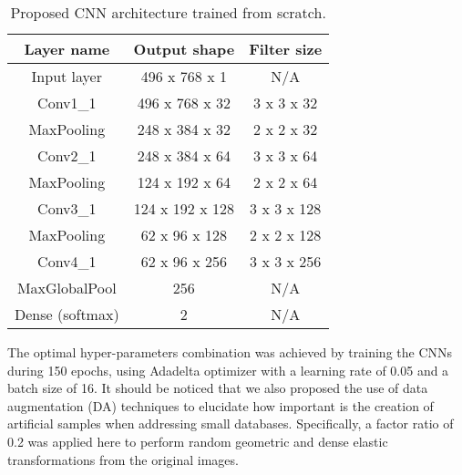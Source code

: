 \begin{table}[htbp]
\caption{Proposed CNN architecture trained from scratch.}
\label{CNN_from_scratch}
\renewcommand{\arraystretch}{1.1} %
\setlength\tabcolsep{8 pt} %
\small
\begin{center}
\begin{tabular}{ccc}
\hline
 \textbf{Layer name} & \textbf{Output shape}                & \textbf{Filter size}            \\ \hline
Input layer         & 496 x 768 x 1                        & N/A                             \\
Conv1\_1            & 496 x 768 x 32                       & 3 x 3 x 32                      \\
MaxPooling          & 248 x 384 x 32                       & 2 x 2 x 32                      \\ 
Conv2\_1            & 248 x 384 x 64                       & 3 x 3 x 64                      \\ 
MaxPooling          & 124 x 192 x 64                       & 2 x 2 x 64                      \\ 
Conv3\_1            & 124 x 192 x 128                       & 3 x 3 x 128                      \\
MaxPooling          & 62  x 96  x 128                       & 2 x 2 x 128                      \\ 
Conv4\_1            & 62  x 96  x 256                      & 3 x 3 x 256                     \\
MaxGlobalPool       & 256                                  & N/A                             \\ 
Dense (softmax)     & 2                                    & N/A                             \\ \hline
\end{tabular}
\end{center}
\end{table}

The optimal hyper-parameters combination was achieved by training the CNNs during 150 epochs, using Adadelta optimizer with a learning rate of 0.05 and a batch size of 16. It should be noticed that we also proposed the use of data augmentation (DA) techniques \cite{wong2016} to elucidate how important is the creation of artificial samples when addressing small databases. Specifically, a factor ratio of 0.2 was applied here to perform random geometric and dense elastic transformations from the original images.




 

